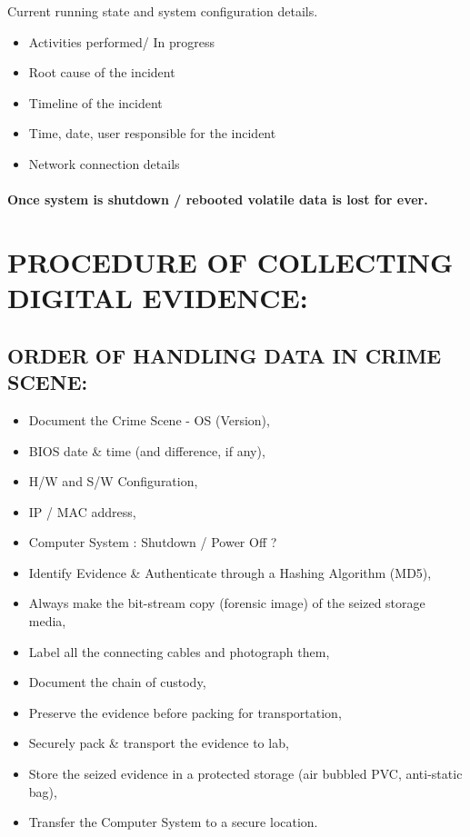 \documentclass[10pt,british,english]{article}
\begin{document}
Current running state and system configuration details.
\begin{itemize}
\item Activities performed/ In progress
\item Root cause of the incident
\item Timeline of the incident
\item Time, date, user responsible for the incident
\item Network connection details
\end{itemize}

\paragraph{Once system is shutdown / rebooted volatile data is lost for ever. }

\section{PROCEDURE OF COLLECTING DIGITAL EVIDENCE:}

\subsection{ORDER OF HANDLING DATA IN CRIME SCENE:}
\begin{itemize}
\item Document the Crime Scene - OS (Version),
\item BIOS date \& time (and difference, if any),
\item H/W and S/W Configuration,
\item IP / MAC address,
\item Computer System : Shutdown / Power Off ?
\item Identify Evidence \& Authenticate through a Hashing Algorithm (MD5),
\item Always make the bit-stream copy (forensic image) of the seized storage
media,
\item Label all the connecting cables and photograph them,
\item Document the chain of custody,
\item Preserve the evidence before packing for transportation,
\item Securely pack \& transport the evidence to lab,
\item Store the seized evidence in a protected storage (air bubbled PVC,
anti-static bag),
\item Transfer the Computer System to a secure location.
\end{itemize}
\end{document}
